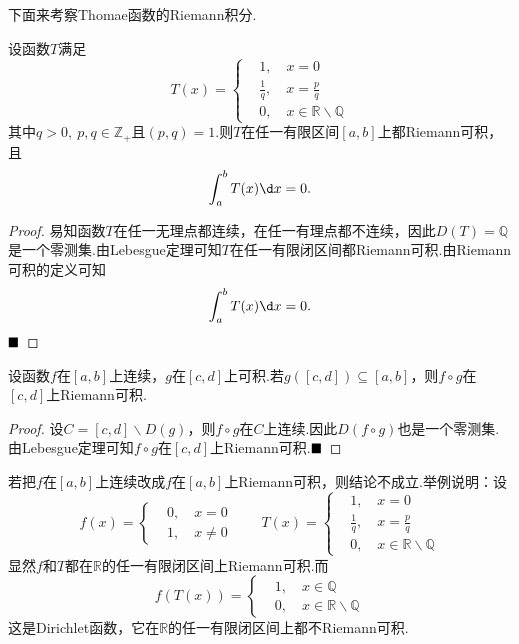 下面来考察Thomae函数的Riemann积分.
\begin{example}
	设函数$T$满足
	\begin{equation*}
		T(x)=\left\{
		\begin{aligned}
			&1,\quad x=0\\
			&\frac{1}{q},\quad x=\frac{p}{q}\\
			&0,\quad x\in\mathbb{R}\backslash\mathbb{Q}
		\end{aligned}
		\right.
	\end{equation*}
	其中$q>0,\ p,q\in\mathbb{Z}_+$且$(p,q)=1$.则$T$在任一有限区间$\left[a,b\right]$上都Riemann可积，且
	$$\int_{a}^{b}T(x)\d x=0.$$
\end{example}
\begin{proof}
	易知函数$T$在任一无理点都连续，在任一有理点都不连续，因此$D(T)=\mathbb{Q}$是一个零测集.由Lebesgue定理可知$T$在任一有限闭区间都Riemann可积.由Riemann可积的定义可知
	$$\int_{a}^{b}T(x)\d x=0.$$
	$\hfill\blacksquare$
\end{proof}
\begin{proposition}
	设函数$f$在$\left[a,b\right]$上连续，$g$在$\left[c,d\right]$上可积.若$g(\left[c,d\right])\subseteq\left[a,b\right]$，则$f\circ g$在$\left[c,d\right]$上Riemann可积.
\end{proposition}
\begin{proof}
	设$C=\left[c,d\right]\backslash D(g)$，则$f\circ g$在$C$上连续.因此$D(f\circ g)$也是一个零测集.由Lebesgue定理可知$f\circ g$在$\left[c,d\right]$上Riemann可积.$\hfill\blacksquare$
\end{proof}
\begin{remark}
	若把$f$在$\left[a,b\right]$上连续改成$f$在$\left[a,b\right]$上Riemann可积，则结论不成立.举例说明：设
	\begin{equation*}
		f(x)=\left\{
		\begin{aligned}
			&0,\quad x=0\\
			&1,\quad x\neq 0
		\end{aligned}
		\right.
		\qquad
		T(x)=\left\{
		\begin{aligned}
			&1,\quad x=0\\
			&\frac{1}{q},\quad x=\frac{p}{q}\\
			&0,\quad x\in\mathbb{R}\backslash\mathbb{Q}
		\end{aligned}
		\right.
	\end{equation*}
	显然$f$和$T$都在$\mathbb{R}$的任一有限闭区间上Riemann可积.而
	\begin{equation*}
		f(T(x))=\left\{
		\begin{aligned}
			&1,\quad x\in\mathbb{Q}\\
			&0,\quad x\in\mathbb{R}\backslash\mathbb{Q}
		\end{aligned}
		\right.
	\end{equation*}
	这是Dirichlet函数，它在$\mathbb{R}$的任一有限闭区间上都不Riemann可积.
\end{remark}

